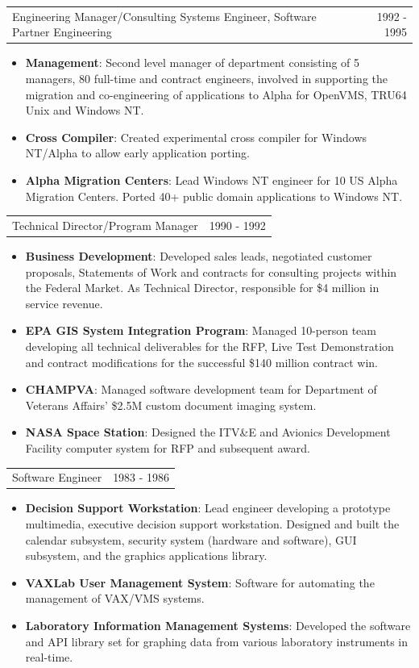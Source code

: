 \documentclass[letterpaper,11pt]{article}
\makeatletter
\newcommand{\resumeCompanyPositionHeading}[2]{
      \item
      \begin{tabular*}{1.0\textwidth}{l@{\extracolsep{\fill}}r}
        {#1} & {#2}
    \end{tabular*}\vspace{-10pt}
}
\newcommand{\resumeItem}[2]{\item{{\textbf{\small#1}}: {\small#2 \vspace{-1pt}}}}
\newcommand{\resumeItemListStart}{\begin{itemize}}
\newcommand{\resumeItemListEnd}{\end{itemize}}\vspace{-10pt}
\makeatother
\begin{document}
          \resumeCompanyPositionHeading
            {Engineering Manager/Consulting Systems Engineer, Software Partner Engineering}
            {1992 - 1995}
            \resumeItemListStart
                \resumeItem{Management}{Second level manager of department consisting of 5 managers, 80 full-time and contract engineers, involved in supporting
                  the migration and co-engineering of applications to Alpha for OpenVMS, TRU64 Unix and Windows NT.}
                \resumeItem{Cross Compiler}{Created experimental cross compiler for Windows NT/Alpha to allow early application porting.}
                \resumeItem{Alpha Migration Centers}{Lead Windows NT engineer for 10 US Alpha Migration Centers. Ported 40+ public domain applications
                  to Windows NT.}
            \resumeItemListEnd

          \resumeCompanyPositionHeading
            {Technical Director/Program Manager}
            {1990 - 1992}
            \resumeItemListStart
                \resumeItem{Business Development}{Developed sales leads, negotiated customer proposals, Statements of Work and contracts for consulting projects
                  within the Federal Market. As Technical Director, responsible for \$4 million in service revenue.}
                \resumeItem{EPA GIS System Integration Program}{Managed 10-person team developing all technical deliverables for the RFP, Live Test Demonstration
                  and contract modifications for the successful \$140 million contract win.}
                \resumeItem{CHAMPVA}{Managed software development team for Department of Veterans Affairs' \$2.5M custom document imaging system.}
                \resumeItem{NASA Space Station}{Designed the ITV\&E and Avionics Development Facility computer system for RFP and subsequent award.}
            \resumeItemListEnd

          \resumeCompanyPositionHeading
            {Software Engineer}
            {1983 - 1986}
            \resumeItemListStart
                \resumeItem{Decision Support Workstation}{Lead engineer developing a prototype multimedia, executive decision support workstation.
                  Designed and built the calendar subsystem, security system (hardware and software), GUI subsystem, and the graphics applications library.}
                \resumeItem{VAXLab User Management System}{Software for automating the management of VAX/VMS systems.}
                \resumeItem{Laboratory Information Management Systems}{Developed the software and API library set for graphing data from various
                  laboratory instruments in real-time.}
            \resumeItemListEnd
\end{document}
